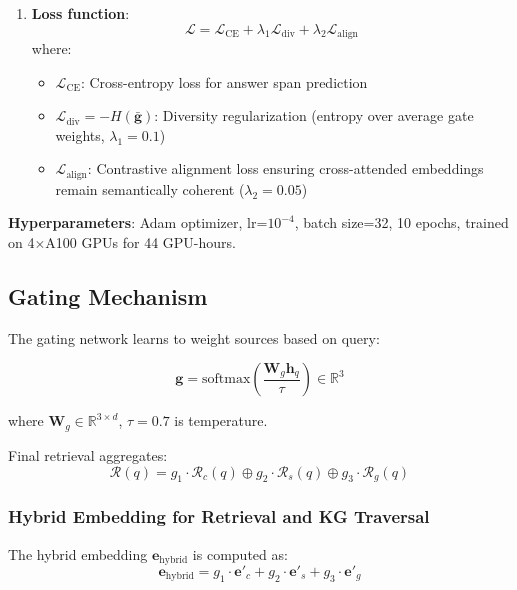 \documentclass[10pt,twocolumn]{article}
\begin{document}
{\begin{enumerate}
    \item \textbf{Loss function}:
    \begin{equation}
    \mathcal{L} = \mathcal{L}_{\text{CE}} + \lambda_1 \mathcal{L}_{\text{div}} + \lambda_2 \mathcal{L}_{\text{align}}
    \end{equation}
    where:
    \begin{itemize}
        \item $\mathcal{L}_{\text{CE}}$: Cross-entropy loss for answer span prediction
        \item $\mathcal{L}_{\text{div}} = -H(\bar{\mathbf{g}})$: Diversity regularization (entropy over average gate weights, $\lambda_1=0.1$)
        \item $\mathcal{L}_{\text{align}}$: Contrastive alignment loss ensuring cross-attended embeddings remain semantically coherent ($\lambda_2=0.05$)
    \end{itemize}
\end{enumerate}

\textbf{Hyperparameters}: Adam optimizer, lr=$10^{-4}$, batch size=32, 10 epochs, trained on 4$\times$A100 GPUs for 44 GPU-hours.
}


\subsection{Gating Mechanism}
\label{sec:gating}

The gating network learns to weight sources based on query:

\begin{equation}
\mathbf{g} = \text{softmax}\left( \frac{\mathbf{W}_g \mathbf{h}_q}{\tau} \right) \in \mathbb{R}^3
\end{equation}

where $\mathbf{W}_g \in \mathbb{R}^{3 \times d}$, $\tau=0.7$ is temperature.

Final retrieval aggregates:
\begin{equation}
\mathcal{R}(q) = g_1 \cdot \mathcal{R}_c(q) \oplus g_2 \cdot \mathcal{R}_s(q) \oplus g_3 \cdot \mathcal{R}_g(q)
\end{equation}


\subsubsection{Hybrid Embedding for Retrieval and KG Traversal}

The hybrid embedding $\mathbf{e}_{\text{hybrid}}$ is computed as:
\begin{equation}
\mathbf{e}_{\text{hybrid}} = g_1 \cdot \mathbf{e}'_c + g_2 \cdot \mathbf{e}'_s + g_3 \cdot \mathbf{e}'_g
\end{equation}
\end{document}

